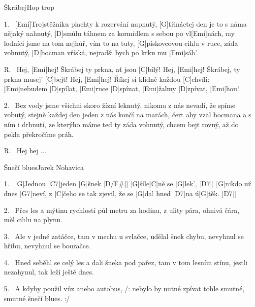 \begin{song}{Škrábej}{Hop trop}

\begin{xverse}{1.~}
[Emi]Trojstěžníku plachty k rozervání napnutý,
[G]třináctej den je to s náma nějaký nahnutý,
[D]smůlu táhnem za kormidlem s sebou po vl[Emi]nách,
my lodníci jsme na tom nejhůř, vím to na tuty,
[G]pískovcovou cihlu v ruce, záda vohnutý,
[D]bocman vříská, nejradši bych po krku mu [Emi]sáh'.
\end{xverse}


\begin{xverse}{R.~}
Hej, [Emi]hej! Škrábej ty prkna, ať jsou [C]bílý!
Hej, [Emi]hej! Škrábej, ty prkna musej' [C]bejt!
Hej, [Emi]hej! Říkej si klidně každou [C]chvíli:
[Emi]nebudem [D]spílat, [Emi]ruce [D]spínat, [Emi]{}žalmy [D]zpívat, [Emi]hou!
\end{xverse}


\begin{xverse}{2.~}
Bez vody jsme všichni skoro žízní leknutý,
nikomu z nás nevadí, že spíme vobutý,
stejně každej den jeden z nás končí na marách,
čert aby vzal bocmana a s ním i drhnutí,
ze kterýho máme teď ty záda vohnutý,
chcem bejt rovný, až do pekla překročíme práh.
\end{xverse}


\begin{xverse}{R.~}
Hej hej ...
\end{xverse}

\end{song}

\begin{song}{Šnečí blues}{Jarek Nohavica}

\begin{xverse}{1.~}
[G]Jednou [C7]jeden [G]{šnek}  [D/F#|]{} [G]{ší}le[C]ně se [G]lek', [D7|]{}
[G]nikdo už dnes [G7]neví, z [C]{če}ho se tak zjevil,
že se [G]dal hned [D7]na  ú[G]těk. [D7|]{}
\end{xverse}


\begin{xverse}{2.~}
Přes les a mýtinu rychlostí půl metru za hodinu,
z ulity pára, ohnivá čára,
měl cihlu na plynu.
\end{xverse}


\begin{xverse}{3.~}
Ale v jedné zatáčce, tam v mechu u svlačce,
udělal šnek chybu, nevyhnul se hřibu,
nevyhnul se bouračce.
\end{xverse}


\begin{xverse}{4.~}
Hned seběhl se celý les a dali šneka pod pařez,
tam v tom lesním stínu, jestli nezahynul,
tak leží ještě dnes.
\end{xverse}


\begin{xverse}{5.~}
A kdyby použil vůz anebo autobus,
/: nebylo by nutné zpívat tohle smutné,
   smutné šnečí blues. :/
\end{xverse}

\end{song}
\chords{ \chordDFis }


